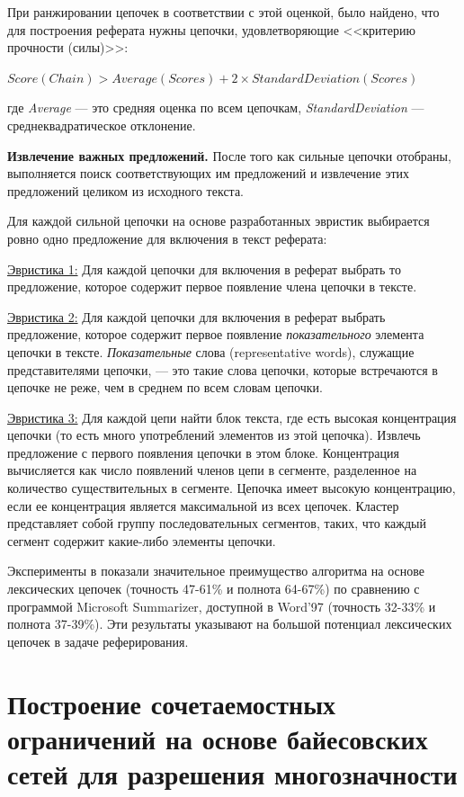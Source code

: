 \documentclass{article}
\begin{document}
\begin{articletext}
При ранжировании цепочек в соответствии с этой оценкой, было найдено, что для построения реферата нужны цепочки, удовлетворяющие <<критерию прочности (силы)>>:

\begin{center}
$Score(Chain) > Average(Scores) + 2 \times StandardDeviation(Scores)$
\end{center}

где \textit{Average} --- это средняя оценка по всем цепочкам, \textit{StandardDeviation} --- среднеквадратическое отклонение.

\textbf{Извлечение важных предложений.} После того как сильные цепочки отобраны, выполняется поиск соответствующих им предложений и извлечение этих предложений целиком из исходного текста.

Для каждой сильной цепочки на основе разработанных эвристик выбирается ровно одно предложение для включения в текст реферата:

\underline{Эвристика 1:} Для каждой цепочки для включения в реферат выбрать то предложение, которое содержит первое появление члена цепочки в тексте.

\underline{Эвристика 2:} Для каждой цепочки для включения в реферат выбрать предложение, которое содержит первое появление \textit{показательного} элемента цепочки в тексте. \textit{Показательные} слова (representative words), служащие представителями цепочки, --- это такие слова цепочки, которые встречаются в цепочке не реже, чем в среднем по всем словам цепочки.

\underline{Эвристика 3:} Для каждой цепи найти блок текста, где есть высокая концентрация цепочки (то есть много употреблений элементов из этой цепочка). Извлечь предложение с первого появления цепочки в этом блоке. Концентрация вычисляется как число появлений членов цепи в сегменте, разделенное на количество существительных в сегменте. Цепочка имеет высокую концентрацию, если ее концентрация является максимальной из всех цепочек. Кластер представляет собой группу последовательных сегментов, таких, что каждый сегмент содержит какие-либо элементы цепочки.

Эксперименты в \cite{Barzilay Elhadad 1997} показали значительное преимущество алгоритма на основе лексических цепочек (точность 47-61\% и полнота 64-67\%) по сравнению с программой Microsoft Summarizer, доступной в Word’97 (точность 32-33\% и полнота 37-39\%). Эти результаты указывают на большой потенциал лексических цепочек в задаче реферирования.


\section{Построение сочетаемостных ограничений на основе байесовских сетей для разрешения многозначности}
\begin{flushright}
\end{flushright}


\end{articletext}
\end{document}
